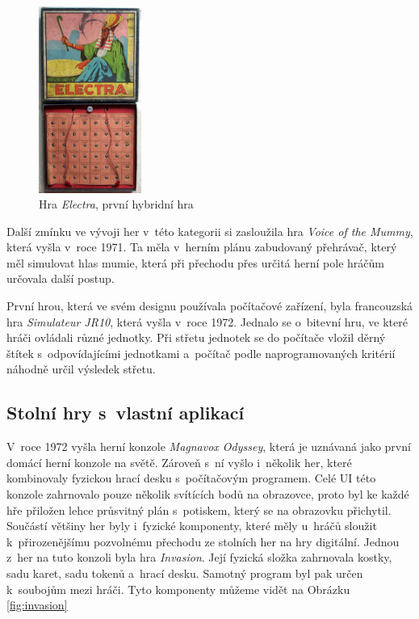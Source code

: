 \begin{figure}[H]
    \centering
    \includegraphics[width=0.3\textwidth]{resources/figures/electra.jpg}
    \caption{Hra \textit{Electra}, první hybridní hra \cite{history_of_hybrid_games}}
    \label{fig:electra}
\end{figure}

Další zmínku ve vývoji her v~této kategorii si zasloužila hra \textit{Voice of the Mummy}, která vyšla v~roce 1971. Ta měla v~herním plánu zabudovaný přehrávač, který měl simulovat hlas mumie, která při přechodu přes určitá herní pole hráčům určovala další postup. \cite{voice_of_the_mummy}

První hrou, která ve svém designu používala počítačové zařízení, byla francouzská hra \textit{Simulateur JR10}, která vyšla v~roce 1972. Jednalo se o~bitevní hru, ve které hráči ovládali různé jednotky. Při střetu jednotek se do počítače vložil děrný štítek s~odpovídajícími jednotkami a~počítač podle naprogramovaných kritérií náhodně určil výsledek střetu. \cite{simulateur_jr10}

\subsection{Stolní hry s~vlastní aplikací}
V~roce 1972 vyšla herní konzole \textit{Magnavox Odyssey}, která je uznávaná jako první domácí herní konzole na světě. Zároveň s~ní vyšlo i~několik her, které kombinovaly fyzickou hrací desku s~počítačovým programem. Celé UI této konzole zahrnovalo pouze několik svítících bodů na obrazovce, proto byl ke každé hře přiložen lehce průsvitný plán s~potiskem, který se na obrazovku přichytil. Součástí většiny her byly i~fyzické komponenty, které měly u~hráčů sloužit k~přirozenějšímu pozvolnému přechodu ze stolních her na hry digitální. \cite{magnavox_odyssey} Jednou z~her na tuto konzoli byla hra \textit{Invasion}. Její fyzická složka zahrnovala kostky, sadu karet, sadu tokenů a~hrací desku. Samotný program byl pak určen k~soubojům mezi hráči. Tyto komponenty můžeme vidět na Obrázku \ref{fig:invasion} \cite{invasion,invasion_gameplay}

